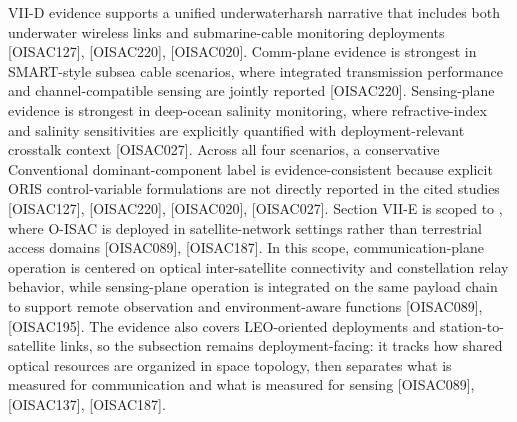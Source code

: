 {}\markdownRendererInterblockSeparator
{}\markdownRendererUlBeginTight
\markdownRendererUlItem VII-D evidence supports a unified underwater\markdownRendererUnderscore{}harsh narrative that includes both underwater wireless links and submarine-cable monitoring deployments [O\markdownRendererUnderscore{}ISAC\markdownRendererUnderscore{}127], [O\markdownRendererUnderscore{}ISAC\markdownRendererUnderscore{}220], [O\markdownRendererUnderscore{}ISAC\markdownRendererUnderscore{}020].\markdownRendererUlItemEnd 
\markdownRendererUlItem Comm-plane evidence is strongest in SMART-style subsea cable scenarios, where integrated transmission performance and channel-compatible sensing are jointly reported [O\markdownRendererUnderscore{}ISAC\markdownRendererUnderscore{}220].\markdownRendererUlItemEnd 
\markdownRendererUlItem Sensing-plane evidence is strongest in deep-ocean salinity monitoring, where refractive-index and salinity sensitivities are explicitly quantified with deployment-relevant crosstalk context [O\markdownRendererUnderscore{}ISAC\markdownRendererUnderscore{}027].\markdownRendererUlItemEnd 
\markdownRendererUlItem Across all four scenarios, a conservative Conventional dominant-component label is evidence-consistent because explicit ORIS control-variable formulations are not directly reported in the cited studies [O\markdownRendererUnderscore{}ISAC\markdownRendererUnderscore{}127], [O\markdownRendererUnderscore{}ISAC\markdownRendererUnderscore{}220], [O\markdownRendererUnderscore{}ISAC\markdownRendererUnderscore{}020], [O\markdownRendererUnderscore{}ISAC\markdownRendererUnderscore{}027].\markdownRendererUlItemEnd 
\markdownRendererUlEndTight \markdownRendererInterblockSeparator
{}
\markdownRendererSectionEnd 
\markdownRendererSectionEnd \markdownRendererSectionBegin
{}\markdownRendererInterblockSeparator
{}\markdownRendererSectionBegin
{}\markdownRendererInterblockSeparator
{}Section VII-E is scoped to , where O-ISAC is deployed in satellite-network settings rather than terrestrial access domains [O\markdownRendererUnderscore{}ISAC\markdownRendererUnderscore{}089], [O\markdownRendererUnderscore{}ISAC\markdownRendererUnderscore{}187]. In this scope, communication-plane operation is centered on optical inter-satellite connectivity and constellation relay behavior, while sensing-plane operation is integrated on the same payload chain to support remote observation and environment-aware functions [O\markdownRendererUnderscore{}ISAC\markdownRendererUnderscore{}089], [O\markdownRendererUnderscore{}ISAC\markdownRendererUnderscore{}195]. The evidence also covers LEO-oriented deployments and station-to-satellite links, so the subsection remains deployment-facing: it tracks how shared optical resources are organized in space topology, then separates what is measured for communication and what is measured for sensing [O\markdownRendererUnderscore{}ISAC\markdownRendererUnderscore{}089], [O\markdownRendererUnderscore{}ISAC\markdownRendererUnderscore{}137], [O\markdownRendererUnderscore{}ISAC\markdownRendererUnderscore{}187].\markdownRendererInterblockSeparator
